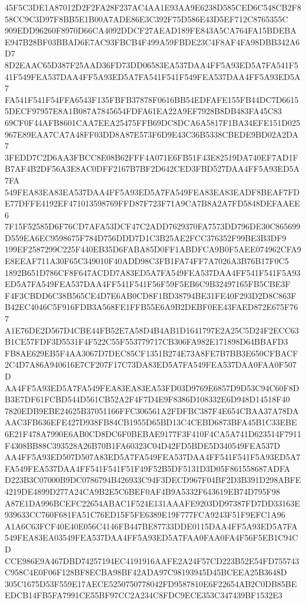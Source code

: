 \documentclass[UTF8,fontset=fandol,zihao=-4,a4paper]{ctexart}
\begin{document}
{{45F5C3DE1A87012D2F2FA28F237AC4AA1E93AA9E6238D585CED6C548CB2F858CC9C3D97F8BB5E1B00A7ADE86E3C392F75D586E43D5EF712C8765355C
909EDD96260F8970D66CA4092DDCF27AEAD189FE843A5CA764FA15BDEBAE947B28BF03BBAD6E7AC93FBCB4F499A59FBDE23C4F8AF4FA98DBB342A6D7
8D2EAAC65D387F25AAD36FD73DD06583EA537DAA4FF5A93ED5A7FA541F541F549FEA537DAA4FF5A93ED5A7FA541F541F549FEA537DAA4FF5A93ED5A7
FA541F541F54FFA6543F135FBFB37878F0616BB54EDFAFE155FB44DC7D66155DECF97957E8A1B087A7845654FDFA61EA22A9EF7928B8DB483FA45C83
69CF0F44AFB8601CAA7EEA25475FFB69DC8DCA6A5817F1BA34EFE151D025967E89EAA7CA7A48FF03DD8A87E573F6D9E43C36B5338CBEDE9BD02A2DA7
3FEDD7C2D6AA3FBCC8E08B62FFF4A071E6FB51F43E82519DA740EF7AD1FB7AF4B2DF56A3E8AC0DFF2167B7BF2D642CED3FBD527DAA4FF5A93ED5A7FA
549FEA83EA83EA537DAA4FF5A93ED5A7FA549FEA83EA83EADF8BEAF7FDE77DFFE4192EF471013598769FFD87F723F71A9CA7B8A2A7FD5848DEFAAEE6
7F15F52585D6F76CD7AFA53DCF47C2ADD7629370FA7573DD796DE30C865699D559EA6EC9598675F784D756DDD7D1C3B25AE2FCC376352F99BE3B3DF9
199EF2587299C225F440EB35D6FABA85D0FF1ABDFCA9B0F5AEE074962CFA9E8EEAF711A30F65C349010F40ADD98C3FB1FA74FF7A7026A3B76B17F0C5
1892B651D786CF8F647ACDD7A83ED5A7FA549FEA537DAA4FF541F541F5A93ED5A7FA549FEA537DAA4FF541F541F56F59F5EB6C9B32497165FB5CBE3F
F4F3CBDD6C38B565CE4D7E6AB0CD8F1BD38794BE31FE40F293D2D8C863FB42EC4046C5F916FDB3A568FE1FFB55E6A9B2DEBF0EE43FAED872E675F767
A1E76DE2D567D4CBE44FB52E7A58D4B4AB1D1641797E2A25C5D24F2ECC63B1CE57FDF3D5531F4F522C55F553779717CB306FA982E171898D64BBAFD3
FB8AE629EB5F4AA3067D7DEC85CF1351B274E73A8FE7B7BB3E650CFBACF2C4D7A86A940616E7CF207F17C73DA83ED5A7FA549FEA537DAA0FAA0F507D
AA4FF5A93ED5A7FA549FEA83EA83EA53FD03D9769E6857D9D53C94C60F8DB3E7DF61FCBD544D561CB52A2F4F7D4E9F8386D108332E6D948D14518F40
7820EDB9EBE24625B37051166FFC306561A2FDFBC387F4E654CBAA37A78DAAAC3FB636EFE427D938FB84CB1955D65BD13C4CEBD6873BFA45B1C33EBE
6E21F478A7990E6AB0CD8DC6F0BEBAE9177F3F410F4CA5A741D623514F7911F4308BB88C393528A26B70B1FA60323C04D42FD5BDE5D340549FEA537D
AA4FF5A93ED507D507A83ED5A7FA549FEA537DAA4FF541F541F5A93ED5A7FA549FEA537DAA4FF541F541F51F49F52B5DF5131D3D05F861558687ADFA
D223B3C07000B9DC0786794B426933C94F3DECD967F04BF2D3B391D298ABFE4219DE4899D277A24CA9B2E5C6BEF0AF4B9A5332F643619EB74D795F98
A87E1DA996BCEFC22654ABAC1F524E131AAAFE9203DD97387FD7DD33163E939633CC760F681FA51C76ED15F5FE6389E19F777FCA9243F51F9EFC1A96
A1A6C63FCF40E40E056C4146FB447BE87733DDE0115DAA4FF5A93ED5A7FA549FEA83EA03549FEA537DAA4FF5A93ED5A7FAA0FAA0FA4F56F5EB1C94CD
CCE986E9A467DBD74257194EC4191916AAFE2A24F57CD223B52E54FD755743C958C4E0F06F128BF8ECBA98BF42ADA97C98193945D45BCEEA25B3648D
305C1675D53F559E17AECE5250750778042FD9587810E6F22654AB2C0DB85BEEDCB14FB5FA7991CE55BF97CC2A234C8FDC9ECE353C347439BF1532E3
}}
\end{document}

